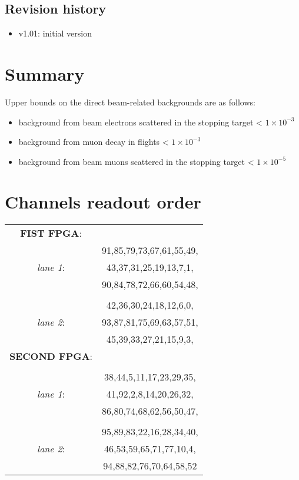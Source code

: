 \documentclass[12pt]{article}
\begin{document}
\subsection {Revision history} 
\begin{itemize}
\item
  v1.01: initial version
\end{itemize}




\newpage
\section{Summary}
Upper bounds on the direct beam-related backgrounds are as follows:
\begin{itemize}
\item
  background from beam electrons scattered in the stopping target < $1 \times 10^{-3}$
\item
  background from muon decay in flights < $1 \times 10^{-3}$
\item
  background from beam muons scattered in the stopping target < $1 \times 10^{-5}$
\end{itemize}
%
\newpage
\appendix\label{order}
\section{Channels readout order}
\begin{center}
\begin{tabular}{cc}
\textbf{FIST FPGA}: & \\
&91,85,79,73,67,61,55,49,\\
\textit{lane 1}: &43,37,31,25,19,13,7,1,\\
&90,84,78,72,66,60,54,48,\\
& \\
&42,36,30,24,18,12,6,0,\\
\textit{lane 2}: &93,87,81,75,69,63,57,51,\\
&45,39,33,27,21,15,9,3,\\
\textbf{SECOND FPGA}:&\\
&\\
&38,44,5,11,17,23,29,35,\\
\textit{lane 1}:&41,92,2,8,14,20,26,32,\\
&86,80,74,68,62,56,50,47,\\
 & \\
&95,89,83,22,16,28,34,40,\\
\textit{lane 2}:&46,53,59,65,71,77,10,4,\\
&94,88,82,76,70,64,58,52\\
\end{tabular}
\end{center}   


\end{document}
